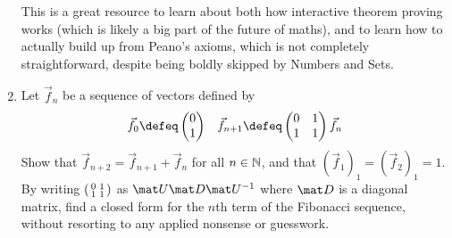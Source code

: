 \documentclass[a4paper,12pt]{article}
\begin{document}
\begin{enumerate}
  This is a great resource to learn about both how interactive theorem proving
  works (which is likely a big part of the future of maths), and to learn how
  to actually build up from Peano's axioms, which is not completely
  straightforward, despite being boldly skipped by Numbers and Sets.
 \item
  Let \(\vec f_n\) be a sequence of vectors defined by
  \begin{align*}
   \vec f_0 \defeq
    \begin{pmatrix} 0 \\ 1 \end{pmatrix}
   &&
   \vec f_{n + 1} \defeq
    \begin{pmatrix} 0 & 1 \\ 1 & 1 \end{pmatrix}\vec f_n
  \end{align*}
  Show that
  \(\vec f_{n + 2} = \vec f_{n + 1} + \vec f_n\) for all
  \(n \in \mathbb N\), and that \((\vec f_1)_1 = (\vec f_2)_1 = 1\). By
  writing \(\begin{psmallmatrix} 0 & 1 \\ 1 & 1 \end{psmallmatrix}\) as
  \(\mat U \mat D \mat U^{-1}\) where \(\mat D\) is a diagonal matrix,
  find a closed form for the \(n\)th term of the Fibonacci sequence, without
  resorting to any applied nonsense or guesswork.
\end{enumerate}
\end{document}

